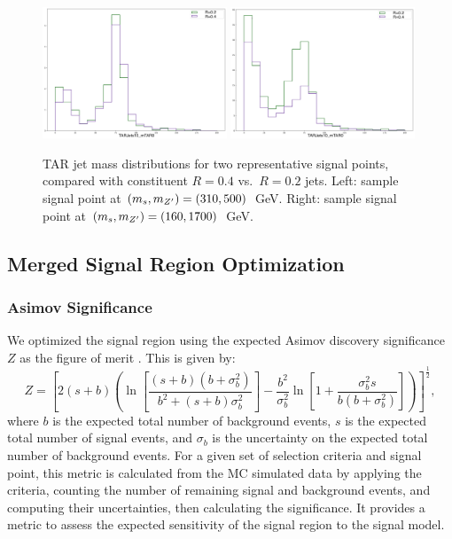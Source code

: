 \begin{figure}[h]
  \centering
     \includegraphics[width = 0.49\textwidth]{Figures/4/TAR/04_monoSww_semilep_zp500_dm200_dh310.png}
     \includegraphics[width = 0.49\textwidth]{Figures/4/TAR/04_monoSww_semilep_zp1700_dm200_dh160.png}

     \caption{TAR jet mass distributions for two representative signal points, compared with constituent \akt $R=0.4$ vs.~\akt $R=0.2$ jets. Left: sample signal point at $(m_s, m_{Z^\prime})=(310, 500)$~GeV. Right: sample signal point at $(m_s, m_{Z^\prime})=(160, 1700)$~GeV.}
     \label{fig:R04_TAR_plots}
\end{figure}
\FloatBarrier
\subsection{Merged Signal Region Optimization}
\subsubsection{Asimov Significance}
We optimized the \merged signal region using the expected Asimov discovery significance $Z$ as the figure of merit  \cite{Asimov}. This is given by:
\begin{equation}
  Z = \left[ 2(s+b)\left(
    \ln\left[ \frac{(s+b)(b+\sigma_b^2)}{b^2 + (s+b)\sigma_b^2} \right]
    - \frac{b^2}{\sigma_b^2}\ln\left[ 1 + \frac{\sigma_b^2 s}{b(b+\sigma_b^2)} \right]
  \right) \right]^\frac{1}{2},
  \label{eq:asimov}
\end{equation}
where $b$ is the expected total number of background events, $s$ is the expected total number of signal events, and $\sigma_b$ is the uncertainty on the expected total number of background events. For a given set of selection criteria and signal point, this metric is calculated from the MC simulated data by applying the criteria, counting the number of remaining signal and background events, and computing their uncertainties, then calculating the significance. It provides a metric to assess the expected sensitivity of the signal region to the signal model.

